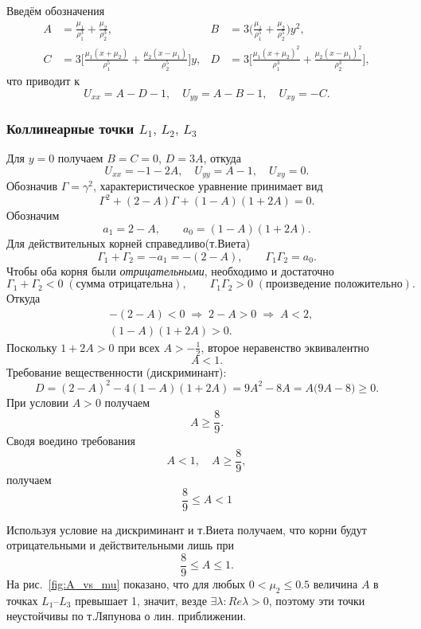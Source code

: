 \documentclass[12pt]{article}
\newcommand{\muone}{\mu_1}
\newcommand{\mutwo}{\mu_2}
\begin{document}
Введём обозначения
\begin{align}
  A &= \frac{\muone}{\rho_1^{3}}+\frac{\mutwo}{\rho_2^{3}}, &
  B &= 3\bigl(\frac{\muone}{\rho_1^{5}}+\frac{\mutwo}{\rho_2^{5}}\bigr)y^{2},\\
  C &= 3\bigl[\frac{\muone(x+\mutwo)}{\rho_1^{5}}+\frac{\mutwo(x-\muone)}{\rho_2^{5}}\bigr]y, &
  D &= 3\bigl[\frac{\muone(x+\mutwo)^{2}}{\rho_1^{3}}+\frac{\mutwo(x-\muone)^{2}}{\rho_2^{3}}\bigr],
\end{align}
что приводит к
\begin{equation}
  U_{xx}=A-D-1,\quad U_{yy}=A-B-1,\quad U_{xy}=-C.
\end{equation}

\subsubsection{Коллинеарные точки $L_1,\,L_2,\,L_3$}
Для $y=0$ получаем $B=C=0$, $D=3A$, откуда
\begin{equation}\label{eq:14}
  U_{xx}=-1-2A,\quad U_{yy}=A-1,\quad U_{xy}=0.
\end{equation}
Обозначив $\Gamma=\gamma^{2}$, характеристическое уравнение принимает вид
\begin{equation}
  \Gamma^{2}+(2-A)\Gamma+(1-A)(1+2A)=0.
\end{equation}
Обозначим
\[
a_1=2-A,\qquad a_0=(1-A)(1+2A).
\]
Для действительных корней справедливо(т.Виета)
\[
\Gamma_1+\Gamma_2=-a_1=-(2-A),\qquad \Gamma_1\Gamma_2=a_0.
\]
Чтобы оба корня были \emph{отрицательными}, необходимо и достаточно
\[
\Gamma_1+\Gamma_2<0\;(\text{сумма отрицательна}),\qquad \Gamma_1\Gamma_2>0\;(\text{произведение положительно}).
\]
Откуда
\begin{align}
&-(2-A)<0\;\Longrightarrow\;2-A>0\;\Longrightarrow\;A<2,\\[4pt]
&(1-A)(1+2A)>0.
\end{align}
Поскольку \(1+2A>0\) при всех \(A>-\tfrac12\), второе неравенство эквивалентно
\[ A<1. \]
Требование вещественности (дискриминант):
\begin{equation}
D=(2-A)^2-4(1-A)(1+2A)=9A^{2}-8A=A\bigl(9A-8\bigr)\ge0.
\end{equation}
При условии \(A>0\) получаем 
\[ A\ge\frac89. \]
Сводя воедино требования
\[ A<1,\quad A\ge\frac89, \]
получаем 
\begin{equation}
\frac89\le A<1
\end{equation}


Используя условие на дискриминант и т.Виета получаем, что корни будут отрицательными и действительными лишь при
\begin{equation}
  \frac{8}{9}\le A\le1.
\end{equation}
На рис.~\ref{fig:A_vs_mu} показано, что для любых $0<\mutwo\le0.5$ величина $A$ в точках $L_1$–$L_3$ превышает 1, значит, везде $\exists\lambda:Re\lambda > 0$, поэтому эти точки неустойчивы по т.Ляпунова о лин. приближении.
\end{document}
